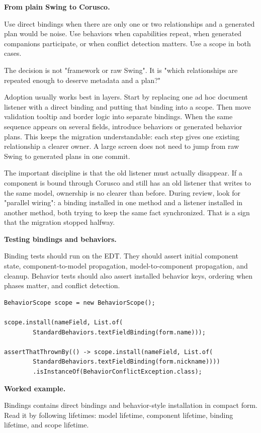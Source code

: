 \textbf{From plain Swing to Corusco.}

Use direct bindings when there are only one or two relationships and a generated
plan would be noise. Use behaviors when capabilities repeat, when generated
companions participate, or when conflict detection matters. Use a scope in both
cases.

The decision is not "framework or raw Swing". It is "which relationships are
repeated enough to deserve metadata and a plan?"

Adoption usually works best in layers. Start by replacing one ad hoc document
listener with a direct binding and putting that binding into a scope. Then move
validation tooltip and border logic into separate bindings. When the same
sequence appears on several fields, introduce behaviors or generated behavior
plans. This keeps the migration understandable: each step gives one existing
relationship a clearer owner. A large screen does not need to jump from raw
Swing to generated plans in one commit.

The important discipline is that the old listener must actually disappear. If a
component is bound through Corusco and still has an old listener that writes to
the same model, ownership is no clearer than before. During review, look for
"parallel wiring": a binding installed in one method and a listener installed in
another method, both trying to keep the same fact synchronized. That is a sign
that the migration stopped halfway.

\textbf{Testing bindings and behaviors.}

Binding tests should run on the EDT. They should assert initial component state,
component-to-model propagation, model-to-component propagation, and cleanup.
Behavior tests should also assert installed behavior keys, ordering when phases
matter, and conflict detection.

\begin{lstlisting}[caption={Behavior conflict test shape.}]
BehaviorScope scope = new BehaviorScope();

scope.install(nameField, List.of(
        StandardBehaviors.textFieldBinding(form.name)));

assertThatThrownBy(() -> scope.install(nameField, List.of(
        StandardBehaviors.textFieldBinding(form.nickname))))
        .isInstanceOf(BehaviorConflictException.class);
\end{lstlisting}

\textbf{Worked example.}

\begin{examplebox}{Bindings}
\swingIntegrationExample{} contains direct bindings and behavior-style
installation in compact form. Read it by following lifetimes: model lifetime,
component lifetime, binding lifetime, and scope lifetime.
\end{examplebox}

